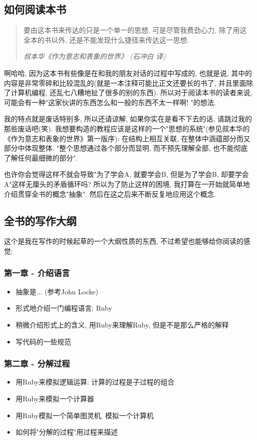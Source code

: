 \subsection*{如何阅读本书}
\begin{quotation}
  要由这本书来传达的只是一个单一的思想, 可是尽管我费劲心力, 除了用这全本的书以外, 还是不能发现什么捷径来传达这一思想. 

  \emph{叔本华《作为意志和表象的世界》 (石冲白 译)}
\end{quotation}

啊哈哈, 因为这本书有些像是在和我的朋友对话的过程中写成的, 也就是说, 其中的内容是非常零碎和比较混乱的(就是一本注释可能比正文还要长的书了, 并且里面除了计算机编程, 还乱七八糟地扯了很多的别的东西). 所以对于阅读本书的读者来说, 可能会有一种"这家伙讲的东西怎么和一般的东西不太一样啊! "的想法. 

我的特点就是废话特别多, 所以还请谅解, 如果你实在是看不下去的话, 请跳过我的那些废话吧(笑). 我想要构造的教程应该是这样的一个"思想的系统"(参见叔本华的《作为意志和表象的世界》第一版序): 在结构上相互关联, 在整体中涵蕴部分而又部分中体现整体. "整个思想通过各个部分而显明, 而不预先理解全部, 也不能彻底了解任何最细微的部分". 

也许你会觉得这样不就会导致"为了学会A, 就要学会B, 但是为了学会B, 却要学会A"这样无厘头的矛盾循环吗? 所以为了防止这样的困境, 我打算在一开始就简单地介绍贯穿全书的概念"抽象". 然后在这之后来不断反复地应用这个概念. 

\subsection*{全书的写作大纲}
这个是我在写作的时候起草的一个大纲性质的东西, 不过希望也能够给你阅读的感觉: 

\subsubsection*{第一章 - 介绍语言}
\begin{itemize}
  \item 抽象是... (参考John Locke)
  \item 形式地介绍一门编程语言: Ruby
  \item 稍微介绍形式上的含义, 用Ruby来理解Ruby, 但是不是那么严格的解释
  \item 写代码的一些规范
\end{itemize}

\subsubsection*{第二章 - 分解过程}
\begin{itemize}
  \item 用Ruby来模拟逻辑运算: 计算的过程是子过程的组合
  \item 用Ruby来模拟一个计算器
  \item 用Ruby模拟一个简单图灵机, 模拟一个计算机
  \item 如何将"分解的过程"用过程来描述
\end{itemize}

